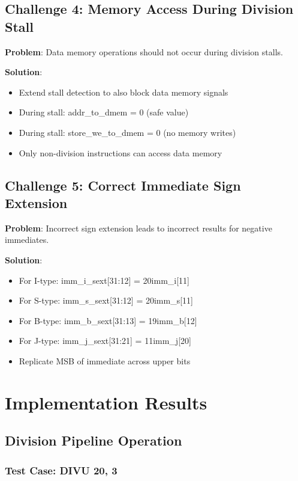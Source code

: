 \documentclass[a4paper, 11pt]{article}
\begin{document}
\subsection{Challenge 4: Memory Access During Division Stall}

\textbf{Problem}: Data memory operations should not occur during division stalls.

\textbf{Solution}:
\begin{itemize}
    \item Extend stall detection to also block data memory signals
    \item During stall: addr\_to\_dmem = 0 (safe value)
    \item During stall: store\_we\_to\_dmem = 0 (no memory writes)
    \item Only non-division instructions can access data memory
\end{itemize}

\subsection{Challenge 5: Correct Immediate Sign Extension}

\textbf{Problem}: Incorrect sign extension leads to incorrect results for negative immediates.

\textbf{Solution}:
\begin{itemize}
    \item For I-type: imm\_i\_sext[31:12] = {20{imm\_i[11]}}
    \item For S-type: imm\_s\_sext[31:12] = {20{imm\_s[11]}}
    \item For B-type: imm\_b\_sext[31:13] = {19{imm\_b[12]}}
    \item For J-type: imm\_j\_sext[31:21] = {11{imm\_j[20]}}
    \item Replicate MSB of immediate across upper bits
\end{itemize}

\newpage

\section{Implementation Results}

\subsection{Division Pipeline Operation}

\subsubsection{Test Case: DIVU 20, 3}
\end{document}

